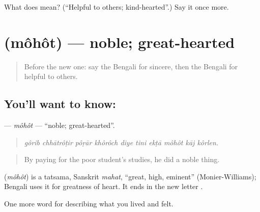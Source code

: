 \begin{tcolorbox}[breakable,colback=teal!4,colframe=teal!35!black,title={Before you move on}]
What does  mean? (\textquotedblleft{}Helpful to others; kind-hearted\textquotedblright{}.) Say it once more.
\end{tcolorbox}
\section[\texorpdfstring{\bn{মহৎ} (môhôt)}{মহৎ (môhôt)}]{ (môhôt) — noble; great-hearted}

\label{lesson:BN-C457-mohot}



\begin{quote}
Before the new one: say the Bengali for sincere, then the Bengali for helpful to others.
\end{quote}

\subsection*{You'll want to know: }
\textbf{} — \emph{môhôt} — \textquotedblleft{}noble; great-hearted\textquotedblright{}.

\begin{quote}
         
\end{quote}

\begin{quote}
\emph{gôrib chhātrôṭir pôṛār khôrôch diye tini ekṭā môhôt kāj kôrlen.}
\end{quote}

\begin{quote}
By paying for the poor student's studies, he did a noble thing.
\end{quote}

\begin{cousinweb}
\textbf{} (\emph{môhôt}) is a tatsama, Sanskrit \emph{mahat}, \textquotedblleft{}great, high, eminent\textquotedblright{} (Monier-Williams); Bengali uses it for greatness of heart. It ends in the new letter .
\end{cousinweb}

\begin{grammarlens}[title={What you've built}]
One more word for describing what you lived and felt.
\end{grammarlens}

